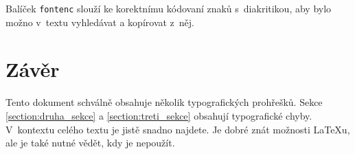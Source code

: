 \documentclass[twocolumn, 10pt, a4paper]{article}
\begin{document}
Balíček \texttt{fontenc} slouží ke korektnímu kódovaní znaků s~diakritikou, aby bylo možno v~textu vyhledávat a kopírovat z~něj.

\section{Závěr}
Tento dokument schválně obsahuje několik typografických prohřešků.
Sekce \ref{section:druha_sekce} a \ref{section:treti_sekce} obsahují typografické chyby.
V~kontextu celého textu je jistě snadno najdete.
Je dobré znát možnosti \LaTeX u, ale je také nutné vědět, kdy je nepoužít.
\end{document}
